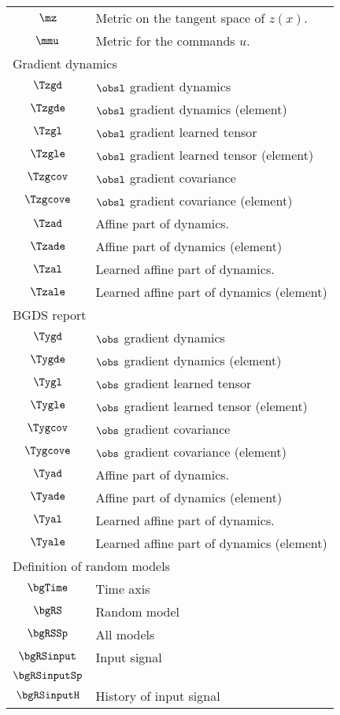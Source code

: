 \begin{longtable}{cl}
 $\mz$ &  Metric on the tangent space of $z(x)$.\\ 
 $\mmu$ &  Metric for the commands $u$. \\ 
 \multicolumn{2}{l}{Gradient dynamics}\\ 
 \hline
$\Tzgd$ &  $\obsl$  gradient dynamics\\ 
 $\Tzgde$ &  $\obsl$  gradient dynamics (element)\\ 
 $\Tzgl$ &  $\obsl$  gradient  learned tensor \\ 
 $\Tzgle$ &  $\obsl$  gradient  learned tensor (element)\\ 
 $\Tzgcov$ &  $\obsl$  gradient  covariance\\ 
 $\Tzgcove$ &  $\obsl$  gradient  covariance (element)\\ 
 $\Tzad$ &  Affine part of dynamics.\\ 
 $\Tzade$ &  Affine part of dynamics (element)\\ 
 $\Tzal$ &  Learned affine part of dynamics.\\ 
 $\Tzale$ &  Learned affine part of dynamics (element)\\ 
 \multicolumn{2}{l}{BGDS report}\\ 
 \hline
$\Tygd$ &  $\obs$ gradient dynamics\\ 
 $\Tygde$ &  $\obs$ gradient dynamics (element)\\ 
 $\Tygl$ &  $\obs$ gradient learned tensor \\ 
 $\Tygle$ &  $\obs$ gradient learned tensor (element)\\ 
 $\Tygcov$ &  $\obs$ gradient covariance\\ 
 $\Tygcove$ &  $\obs$ gradient covariance (element)\\ 
 $\Tyad$ &  Affine part of dynamics.\\ 
 $\Tyade$ &  Affine part of dynamics (element)\\ 
 $\Tyal$ &  Learned affine part of dynamics.\\ 
 $\Tyale$ &  Learned affine part of dynamics (element)\\ 
 \multicolumn{2}{l}{Definition of random models}\\ 
 \hline
$\bgTime$ &  Time axis\\ 
 $\bgRS$ &  Random model\\ 
 $\bgRSSp$ &  All models\\ 
 $\bgRSinput$ &  Input signal\\ 
 $\bgRSinputSp$ &  \\ 
 $\bgRSinputH$ &  History of input signal\\ 

\end{longtable}
